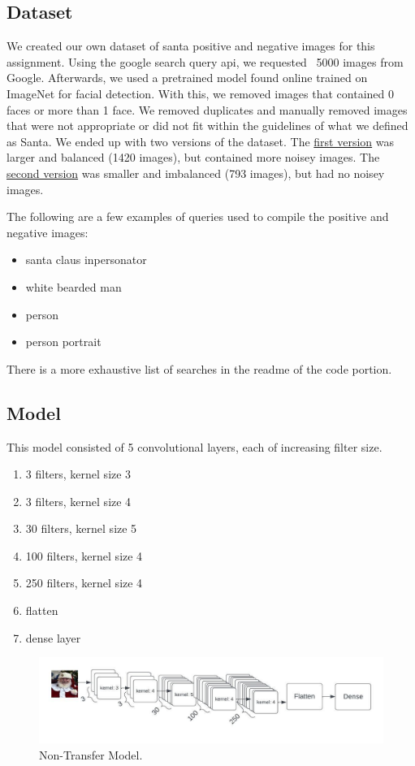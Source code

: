 \subsection{Dataset}
We created our own dataset of santa positive and negative images for this assignment. Using the google search query api, we requested 
~5000 images from Google. Afterwards, we used a pretrained model found online trained on ImageNet for facial detection. With this, we removed 
images that contained 0 faces or more than 1 face. We removed duplicates and manually removed images that were not appropriate or did not fit within the 
guidelines of what we defined as Santa. We ended up with two versions of the dataset. The \href{https://www.kaggle.com/datasets/ianmaloney/santa-images}{first version} was larger and balanced (1420 images), but contained more noisey images. The 
\href{https://www.kaggle.com/datasets/ianmaloney/updated-santa}{second version} was smaller and imbalanced (793 images), but had no noisey images. 

The following are a few examples of queries used to compile the positive and negative images:
\begin{itemize}
    \item santa claus inpersonator
    \item white bearded man
    \item person
    \item person portrait
\end{itemize}

There is a more exhaustive list of searches in the readme of the code portion. 

\subsection{Model}


This model consisted of 5 convolutional layers, each of increasing filter size.
\begin{enumerate}
    \item 3 filters, kernel size 3
    \item 3 filters, kernel size 4 
    \item 30 filters, kernel size 5 
    \item 100 filters, kernel size 4 
    \item 250 filters, kernel size 4 
    \item flatten 
    \item dense layer 
\end{enumerate}
\begin{figure}[h]
    \centering
    \includegraphics[width=\linewidth]{img/santa.jpg}
    \caption{Non-Transfer Model.}
    \label{fig:result1}
\end{figure}

